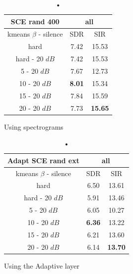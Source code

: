 \documentclass[master, tikz, final,11pt, dvipdfmx]{iscs-thesis}
\begin{document}
\begin{table}
\begin{subtable}{.5\linewidth}
\centering
\begin{tabular}{c|c|c}
SCE rand 400 & \multicolumn{2}{c}{all} \\  
\hline 
kmeans $\beta$ - silence & SDR & SIR  \\ 
\hline
hard  & 7.42 & 15.53  \\ 
\hline
hard - 20 $dB$  & 7.42 & 15.53 \\
\hline
\hline
5 - 20 $dB$  & 7.67 & 12.73 \\ 
\hline
10 - 20 $dB$  & \cellcolor{green}\textbf{8.01} & \cellcolor{green}15.34 \\ 
\hline
15 - 20 $dB$ & 7.84 & 15.59  \\ 
\hline
20 - 20 $dB$ & 7.73 & \textbf{15.65}  \\ 
\end{tabular}
\captionsetup{justification=centering}
\caption{Using spectrograms}
\label{table:SCErand400}
\end{subtable}%
\begin{subtable}{.5\linewidth}
\centering
\begin{tabular}{c|c|c}
Adapt SCE rand ext & \multicolumn{2}{c}{all} \\  
\hline 
kmeans $\beta$ - silence & SDR & SIR  \\ 
\hline
hard  & 6.50 & 13.61  \\ 
hard - 20 $dB$  & 5.91 & 13.46 \\
\hline
\hline
5 - 20 $dB$  & 6.05 & 10.27 \\ 
10 - 20 $dB$  & \cellcolor{green}\textbf{6.36} & \cellcolor{green}13.22 \\ 
15 - 20 $dB$ & 6.21 & 13.60  \\ 
20 - 20 $dB$ & 6.14 & \textbf{13.70}  \\ 
\end{tabular}
\caption{Using the Adaptive layer}
\label{table:AdaptSCErand400}
\end{subtable}
\caption{•}
\end{table}
\end{document}
